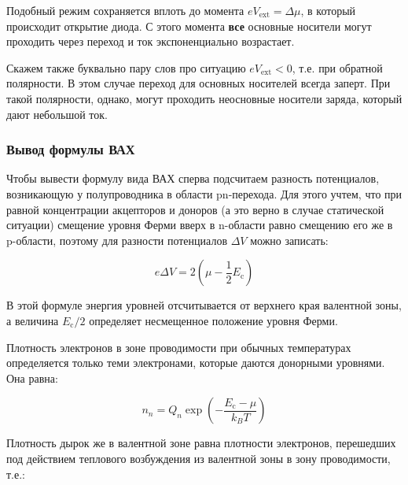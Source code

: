 \documentclass[a4paper, 12pt]{article}
\begin{document}
Подобный режим сохраняется вплоть до момента $e V_{\text{ext}} = \Delta \mu$, в который происходит открытие диода. С этого момента \textbf{все} основные носители могут проходить через переход и ток экспоненциально возрастает.

Скажем также буквально пару слов про ситуацию $e V_{\text{ext}} < 0$, т.е. при обратной полярности. В этом случае переход для основных носителей всегда заперт. При такой полярности, однако, могут проходить неосновные носители заряда, который дают небольшой ток.


\subsubsection{Вывод формулы ВАХ}

Чтобы вывести формулу вида ВАХ сперва подсчитаем разность потенциалов, возникающую у полупроводника в области pn-перехода. Для этого учтем, что при равной концентрации акцепторов и доноров (а это верно в случае статической ситуации) смещение уровня Ферми вверх в n-области равно смещению его же в p-области, поэтому для разности потенциалов $\Delta V$ можно записать: 

\begin{equation}
	e\Delta V = 2 \left(\mu - \frac{1}{2} E_{\text{c}}\right)
\end{equation}

В этой формуле энергия уровней отсчитывается от верхнего края валентной зоны, а величина $E_{\text{c}}/2$ определяет несмещенное положение уровня Ферми.

Плотность электронов в зоне проводимости при обычных температурах определяется только теми электронами, которые даются донорными уровнями. Она равна:

\begin{equation}
	n_n = Q_n \exp\left(-\frac{E_{\text{c}} - \mu}{k_B T}\right)
\end{equation}

Плотность дырок же в валентной зоне равна плотности электронов, перешедших под действием теплового возбуждения из валентной зоны в зону проводимости, т.е.:
\end{document}
